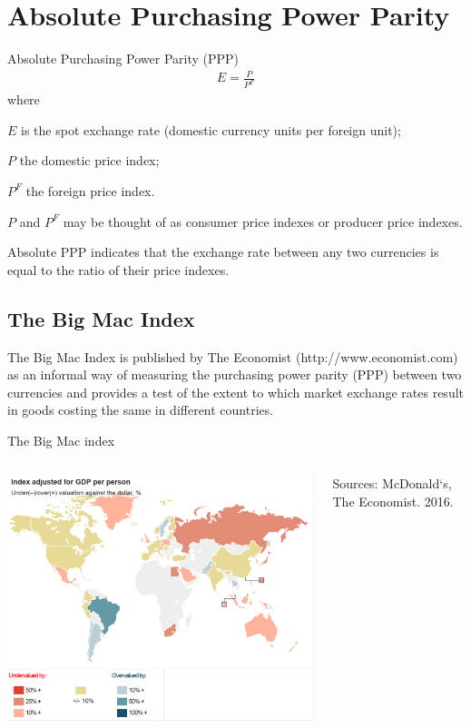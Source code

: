 \documentclass[international_finance_p2.tex]{subfiles}
\begin{document}
\section{Absolute Purchasing Power Parity}
\begin{frame}{Absolute Purchasing Power Parity (PPP)}
\begin{align}
E=\frac{P}{P^F}
\end{align}
where 

$E$ is the spot exchange rate (domestic currency units per foreign unit);

$P$ the domestic price index;

$P^F$ the foreign price index.

$P$ and $P^F$ may be thought of as consumer price indexes or producer price indexes.

Absolute PPP indicates that the exchange rate between any two currencies is equal to the ratio of their price indexes.
\end{frame}
\subsection{The Big Mac Index}
\begin{frame}
\begin{block}{The Big Mac Index}
\quad is published by The Economist (http://www.economist.com) as an informal way of measuring the purchasing power parity (PPP) between two currencies and provides a test of the extent to which market exchange rates result in goods costing the same in different countries.
\end{block}
\end{frame}
\begin{frame}{The Big Mac index}
\begin{columns}
\begin{column}{0.5\textwidth}
\includegraphics[scale=0.5]{img/bigmac}
\end{column}
\begin{column}{0.4\textwidth}

Sources: McDonald`s, The Economist. 2016.
\end{column}
\end{columns}
\end{frame}
\end{document}
